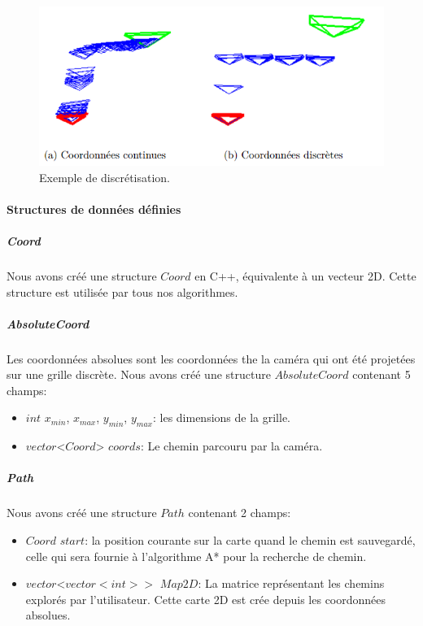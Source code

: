 \documentclass[11pt]{article}
\begin{document}
         \begin{figure}[hbt]  
          \includegraphics[width=\textwidth]{Coordonnees.png}    
          \caption{Exemple de discrétisation.}
          \label{fig:Coordonnees}
        \end{figure}  

        \paragraph{Structures de données définies}

          \subparagraph{Coord}
            Nous avons créé une structure $Coord$ en C++, équivalente à un vecteur 2D. Cette structure est utilisée par tous nos algorithmes.
            
          \subparagraph{AbsoluteCoord}
            Les coordonnées absolues sont les coordonnées the la caméra qui ont été projetées sur une grille discrète. Nous avons créé une 
            structure $AbsoluteCoord$ contenant 5 champs:

            \begin{itemize}
              \item $int$ $x_{min}$, $x_{max}$, $y_{min}$, $y_{max}$: les dimensions de la grille.
              \item $vector$<$Coord$> $coords$: Le chemin parcouru par la caméra.          
            \end{itemize}    

          \subparagraph{Path}        
            Nous avons créé une structure $Path$ contenant 2 champs: 
            \begin{itemize}
              \item $Coord$ $start$: la position courante sur la carte quand le chemin est sauvegardé, celle qui sera fournie à l'algorithme
              A* pour la recherche de chemin.
              \item $vector$<$vector<int>>$ $Map2D$: La matrice représentant les chemins explorés par l'utilisateur. Cette carte 2D est crée 
              depuis les coordonnées absolues.     
            \end{itemize} 
\end{document}
